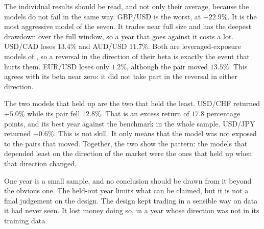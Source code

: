 The individual results should be read, and not only their average, because the models do not fail in the same way. GBP/USD is the worst, at $-22.9\%$. It is the most aggressive model of the seven. It trades near full size and has the deepest drawdown over the full window, so a year that goes against it costs a lot. USD/CAD loses $13.4\%$ and AUD/USD $11.7\%$. Both are leveraged-exposure models of , so a reversal in the direction of their beta is exactly the event that hurts them. EUR/USD loses only $1.2\%$, although the pair moved $13.5\%$. This agrees with its beta near zero: it did not take part in the reversal in either direction.

The two models that held up are the two that held the least. USD/CHF returned $+5.0\%$ while its pair fell $12.8\%$. That is an excess return of $17.8$ percentage points, and its best year against the benchmark in the whole sample. USD/JPY returned $+0.6\%$. This is not skill. It only means that the model was not exposed to the pairs that moved. Together, the two show the pattern: the models that depended least on the direction of the market were the ones that held up when that direction changed.

One year is a small sample, and no conclusion should be drawn from it beyond the obvious one. The held-out year limits what can be claimed, but it is not a final judgement on the design. The design kept trading in a sensible way on data it had never seen. It lost money doing so, in a year whose direction was not in its training data.